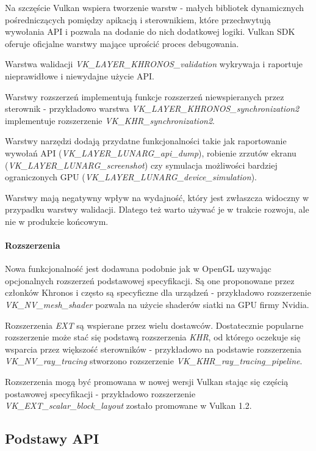 Na szczęście Vulkan wspiera tworzenie warstw - małych bibliotek dynamicznych pośredniczących pomiędzy apikacją i sterownikiem, które przechwytują wywołania API i pozwala na dodanie do nich dodatkowej logiki.
Vulkan SDK oferuje oficjalne warstwy mające uprościć proces debugowania.

Warstwa walidacji \textit{VK\_LAYER\_KHRONOS\_validation} wykrywaja i raportuje nieprawidłowe i niewydajne użycie API.

Warstwy rozszerzeń implementują funkcje rozszerzeń niewspieranych przez sterownik - przykładowo warstwa \textit{VK\_LAYER\_KHRONOS\_synchronization2} implementuje rozszerzenie \textit{VK\_KHR\_synchronization2}.

Warstwy narzędzi dodają przydatne funkcjonalności takie jak raportowanie wywołań API (\textit{VK\_LAYER\_LUNARG\_api\_dump}), robienie zrzutów ekranu (\textit{VK\_LAYER\_LUNARG\_screenshot}) czy symulacja możliwości bardziej ograniczonych GPU (\textit{VK\_LAYER\_LUNARG\_device\_simulation}).

Warstwy mają negatywny wpływ na wydajność, który jest zwłaszcza widoczny w przypadku warstwy walidacji. Dlatego też warto używać je w trakcie rozwoju, ale nie w produkcie końcowym.

\paragraph{Rozszerzenia}

Nowa funkcjonalność jest dodawana podobnie jak w OpenGL uzywając opcjonalnych rozszerzeń podstawowej specyfikacji. Są one proponowane przez członków Khronos i często są specyficzne dla urządzeń - przykładowo rozszerzenie \textit{VK\_NV\_mesh\_shader} pozwala na użycie shaderów siatki na GPU firmy Nvidia.

Rozszerzenia \textit{EXT} są wspierane przez wielu dostawców. Dostatecznie popularne rozszerzenie może stać się podstawą rozszerzenia \textit{KHR}, od którego oczekuje się wsparcia przez większość sterowników - przykładowo na podstawie rozszerzenia \textit{VK\_NV\_ray\_tracing} stworzono rozszerzenie \textit{VK\_KHR\_ray\_tracing\_pipeline}.

Rozszerzenia mogą być promowana w nowej wersji Vulkan stając się częścią postawowej specyfikacji - przykładowo rozszerzenie \textit{VK\_EXT\_scalar\_block\_layout} zostało promowane w Vulkan 1.2.

\subsection{Podstawy API}

